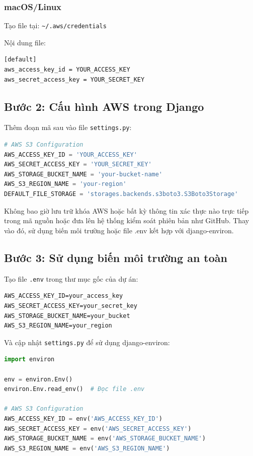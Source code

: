 \subsubsection{macOS/Linux}
Tạo file tại: \texttt{\~{}/.aws/credentials}

Nội dung file:

\begin{lstlisting}
[default]
aws_access_key_id = YOUR_ACCESS_KEY
aws_secret_access_key = YOUR_SECRET_KEY
\end{lstlisting}

\subsection{Bước 2: Cấu hình AWS trong Django}

Thêm đoạn mã sau vào file \texttt{settings.py}:

\begin{lstlisting}[language=python]
# AWS S3 Configuration
AWS_ACCESS_KEY_ID = 'YOUR_ACCESS_KEY'
AWS_SECRET_ACCESS_KEY = 'YOUR_SECRET_KEY'
AWS_STORAGE_BUCKET_NAME = 'your-bucket-name'
AWS_S3_REGION_NAME = 'your-region'
DEFAULT_FILE_STORAGE = 'storages.backends.s3boto3.S3Boto3Storage'
\end{lstlisting}

\begin{tcolorbox}[colback=red!5, colframe=red!50!black, title=Cảnh báo bảo mật]
Không bao giờ lưu trữ khóa AWS hoặc bất kỳ thông tin xác thực nào trực tiếp trong mã nguồn hoặc đưa lên hệ thống kiểm soát phiên bản như GitHub. Thay vào đó, sử dụng biến môi trường hoặc file .env kết hợp với django-environ.
\end{tcolorbox}

\subsection{Bước 3: Sử dụng biến môi trường an toàn}

Tạo file \texttt{.env} trong thư mục gốc của dự án:

\begin{lstlisting}
AWS_ACCESS_KEY_ID=your_access_key
AWS_SECRET_ACCESS_KEY=your_secret_key
AWS_STORAGE_BUCKET_NAME=your_bucket
AWS_S3_REGION_NAME=your_region
\end{lstlisting}

Và cập nhật \texttt{settings.py} để sử dụng django-environ:

\begin{lstlisting}[language=python]
import environ

env = environ.Env()
environ.Env.read_env()  # Đọc file .env

# AWS S3 Configuration
AWS_ACCESS_KEY_ID = env('AWS_ACCESS_KEY_ID')
AWS_SECRET_ACCESS_KEY = env('AWS_SECRET_ACCESS_KEY')
AWS_STORAGE_BUCKET_NAME = env('AWS_STORAGE_BUCKET_NAME')
AWS_S3_REGION_NAME = env('AWS_S3_REGION_NAME')
\end{lstlisting}

